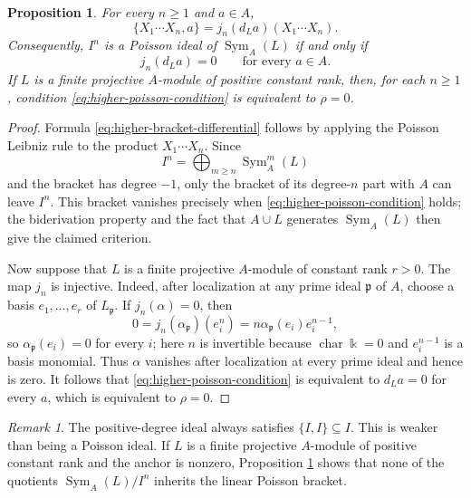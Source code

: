 \documentclass[12pt,reqno]{amsart}
\newtheorem{proposition}[theorem]{Proposition}
\theoremstyle{definition}
\theoremstyle{remark}
\newtheorem{remark}[theorem]{Remark}
\newcommand{\kk}{\Bbbk}
\newcommand{\Sym}{\operatorname{Sym}}
\begin{document}
	\begin{proposition}\label{prop:higher-truncations}
		For every $n\geq1$ and $a\in A$,
		\begin{equation}\label{eq:higher-bracket-differential}
			\{X_1\cdots X_n,a\}
			=j_n(d_La)(X_1\cdots X_n).
		\end{equation}
		Consequently, $I^n$ is a Poisson ideal of $\Sym_A(L)$ if and only if
		\begin{equation}\label{eq:higher-poisson-condition}
			j_n(d_La)=0
			\qquad\text{for every }a\in A.
		\end{equation}
		If $L$ is a finite projective $A$-module of positive constant rank, then, for
		each $n\geq1$, condition \eqref{eq:higher-poisson-condition} is equivalent to
		$\rho=0$.
	\end{proposition}
	
	\begin{proof}
		Formula \eqref{eq:higher-bracket-differential} follows by applying the Poisson
		Leibniz rule to the product $X_1\cdots X_n$.  Since
		\[
		I^n=\bigoplus_{m\geq n}\Sym_A^m(L)
		\]
		and the bracket has  degree $-1$, only the bracket of its degree-$n$
		part with $A$ can leave $I^n$.  This bracket vanishes precisely when
		\eqref{eq:higher-poisson-condition} holds; the biderivation property and the
		fact that $A\cup L$ generates $\Sym_A(L)$ then give the claimed criterion.
		
		Now suppose that $L$ is a finite projective $A$-module of constant rank
		$r>0$.  The map $j_n$ is injective.  Indeed, after localization at any prime ideal
		$\mathfrak p$ of $A$, choose a basis $e_1,\ldots,e_r$ of $L_{\mathfrak p}$.
		If $j_n(\alpha)=0$, then
		\[
		0=j_n(\alpha_{\mathfrak p})(e_i^n)
		=n\alpha_{\mathfrak p}(e_i)e_i^{n-1},
		\]
		so $\alpha_{\mathfrak p}(e_i)=0$ for every $i$; here $n$ is invertible
		because $\operatorname{char}\kk=0$ and $e_i^{n-1}$ is a basis monomial.
		Thus $\alpha$ vanishes after localization at every prime ideal and hence is zero.
		It follows that \eqref{eq:higher-poisson-condition} is
		equivalent to $d_La=0$ for every $a$, which is equivalent to $\rho=0$.
	\end{proof}
	
	\begin{remark}\label{rem:coisotropic-not-poisson}
		The positive-degree ideal always satisfies $\{I,I\}\subseteq I$. This is weaker than being a
		Poisson ideal.  If $L$ is a finite projective $A$-module of positive constant
		rank and the anchor is nonzero, Proposition \ref{prop:higher-truncations}
		shows that none of the quotients $\Sym_A(L)/I^n$ inherits the linear Poisson
		bracket.
	\end{remark}
	
\end{document}
